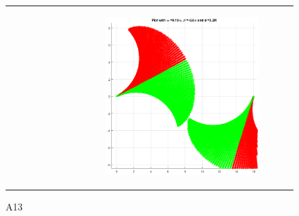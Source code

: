\documentclass[11pt]{article} %
\begin{document}
\begin{figure}[H]
\begin{tabular}{cc}
\begin{subfigure}[b]{0.4\columnwidth}
        		 \label{fig:a13_3}
      		 \end{subfigure}
      		  &
      		 \begin{subfigure}[b]{0.4\columnwidth}
			\parbox[c]{1em}{\includegraphics[width=6cm,height=6cm,keepaspectratio]{a13_4.png}}
        		 \label{fig:a13_4}
      		 \end{subfigure}
	\end{tabular}
	\caption{A13}
\end{figure}
\end{document}
